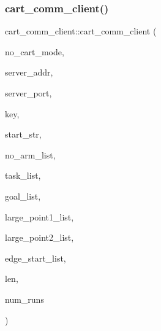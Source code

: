 \subsubsection{\texorpdfstring{cart\+\_\+comm\+\_\+client()}{cart\_comm\_client()}}
{\footnotesize\ttfamily cart\+\_\+comm\+\_\+client\+::cart\+\_\+comm\+\_\+client (\begin{DoxyParamCaption}\item[{int}]{no\+\_\+cart\+\_\+mode,  }\item[{char $\ast$}]{server\+\_\+addr,  }\item[{ulapi\+\_\+integer}]{server\+\_\+port,  }\item[{ulapi\+\_\+id}]{key,  }\item[{char $\ast$}]{start\+\_\+str,  }\item[{int $\ast$}]{no\+\_\+arm\+\_\+list,  }\item[{char $\ast$$\ast$}]{task\+\_\+list,  }\item[{\mbox{\hyperlink{structld__msg__pose}{ld\+\_\+msg\+\_\+pose}} $\ast$$\ast$}]{goal\+\_\+list,  }\item[{P\+M\+\_\+\+C\+A\+R\+T\+E\+S\+I\+AN $\ast$$\ast$}]{large\+\_\+point1\+\_\+list,  }\item[{P\+M\+\_\+\+C\+A\+R\+T\+E\+S\+I\+AN $\ast$$\ast$}]{large\+\_\+point2\+\_\+list,  }\item[{P\+M\+\_\+\+C\+A\+R\+T\+E\+S\+I\+AN $\ast$$\ast$}]{edge\+\_\+start\+\_\+list,  }\item[{int}]{len,  }\item[{int}]{num\+\_\+runs }\end{DoxyParamCaption})}

